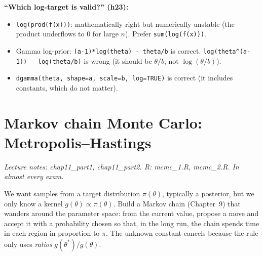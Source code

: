 \begin{traps}
\textbf{``Which log-target is valid?'' (h23):}
\begin{itemize}
  \item \texttt{log(prod(f(x)))}: mathematically right but numerically unstable (the product underflows to 0 for large $n$). Prefer \texttt{sum(log(f(x)))}.
  \item Gamma log-prior: \texttt{(a-1)*log(theta) - theta/b} is correct. \texttt{log(theta\^{}(a-1)) - log(theta/b)} is wrong (it should be $\theta/b$, not $\log(\theta/b)$).
  \item \texttt{dgamma(theta, shape=a, scale=b, log=TRUE)} is correct (it includes constants, which do not matter).
\end{itemize}
\end{traps}

\section{Markov chain Monte Carlo: Metropolis--Hastings}
\textit{Lecture notes: chap11\_part1, chap11\_part2. R: mcmc\_1.R, mcmc\_2.R. In almost every exam.}

\begin{idea}
We want samples from a target distribution $\pi(\theta)$, typically a posterior, but we only know a kernel $g(\theta)\propto\pi(\theta)$. Build a Markov chain (Chapter~9) that wanders around the parameter space: from the current value, propose a move and accept it with a probability chosen so that, in the long run, the chain spends time in each region in proportion to $\pi$. The unknown constant cancels because the rule only uses \emph{ratios} $g(\theta^*)/g(\theta)$.
\end{idea}


